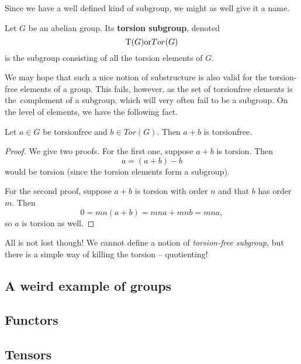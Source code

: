 
Since we have a well defined kind of subgroup, we might as well give it a name.

\begin{defn}
    Let \( G \) be an abelian group. Its \textbf{torsion subgroup}, denoted
    \[ 
        {\rm T}(G) {\rm or} Tor(G) 
   \]
   is the subgroup consisting of all the torsion elements of \( G \).
\end{defn}

We may hope that such a nice notion of substructure is also valid for the torsion-free
elements of a group. This fails, however, as the set of torsionfree elements is
the~complement of a subgroup, which will very often fail to be a subgroup. On the level
of elements, we have the following fact.

\begin{thm}
    Let \( a \in G \) be torsionfree and \( b \in Tor(G) \). Then \( a + b \) is torsionfree.
\end{thm}

\begin{proof}
    We give two proofs. For the first one, suppose \( a + b \) is torsion. Then
    \[ 
       a = (a + b) - b 
   \]
   would be torsion (since the torsion elements form a subgroup).

   For the second proof, suppose \( a + b \) is torsion with order \( n \) and
   that \( b \) has order \( m \). Then
   \[ 
      0 = mn(a + b) = mna + mnb = mna, 
   \]
   so \( a \) is torsion as well.
\end{proof}

All is not lost though! We cannot define a notion of \textit{torsion-free subgroup},
but there is a simple way of killing the torsion -- quotienting!

\subsection{A weird example of groups}

\subsection{Functors}

\subsection{Tensors}


